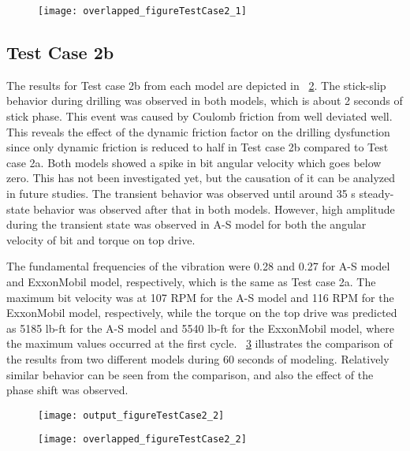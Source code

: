 \begin{figure}
  \centering
  \texttt{[image: overlapped\_figureTestCase2\_1]}
  \caption{}\label{figure_testcase2_1_overlapped}
\end{figure}


\subsection{Test Case 2b}
The results for Test case 2b from each model are depicted in \figurename~\ref{figure_testcase2_2}. The stick-slip behavior during drilling was observed in both models, which is about 2 seconds of stick phase. This event was caused by Coulomb friction from well deviated well. This reveals the effect of the dynamic friction factor on the drilling dysfunction since only dynamic friction is reduced to half in Test case 2b compared to Test case 2a. Both models showed a spike in bit angular velocity which goes below zero. This has not been investigated yet, but the causation of it can be analyzed in future studies. The transient behavior was observed until around 35 s steady-state behavior was observed after that in both models. However, high amplitude during the transient state was observed in A-S model for both the angular velocity of bit and torque on top drive. 

The fundamental frequencies of the vibration were 0.28 and 0.27 for A-S model and ExxonMobil model, respectively, which is the same as Test case 2a. The maximum bit velocity was at 107 RPM for the A-S model and 116 RPM for the ExxonMobil model, respectively, while the torque on the top drive was predicted as 5185 lb-ft for the A-S model and 5540 lb-ft for the ExxonMobil model, where the maximum values occurred at the first cycle. \figurename~\ref{figure_testcase2_2_overlapped} illustrates the comparison of the results from two different models during 60 seconds of modeling. Relatively similar behavior can be seen from the comparison, and also the effect of the phase shift was observed.

\begin{figure}
  \centering
  \texttt{[image: output\_figureTestCase2\_2]}
  \caption{}\label{figure_testcase2_2}
\end{figure}

\begin{figure}
  \centering
  \texttt{[image: overlapped\_figureTestCase2\_2]}
  \caption{}\label{figure_testcase2_2_overlapped}
\end{figure}

